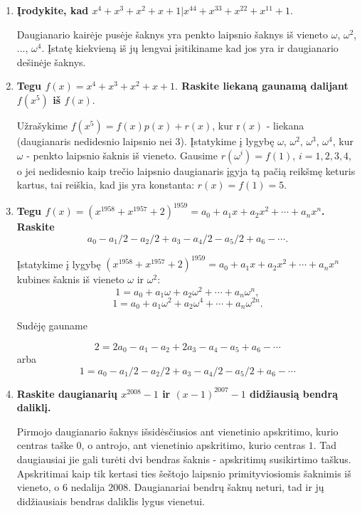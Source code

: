 \begin{enumerate}
\medskip 

\item {\bf Įrodykite, kad $x^4 + x^3 + x^2 + x + 1|x^{44} + x^{33} + x^{22} + x^{11} + 1.$}

\medskip

Daugianario kairėje pusėje šaknys yra penkto laipsnio šaknys iš vieneto $\omega$, $\omega^2$, $\dots$, $\omega^4$. Įstatę kiekvieną iš jų lengvai įsitikiname kad jos yra ir daugianario dešinėje šaknys.

\medskip

\item {\bf Tegu $f(x) = x^4 + x^3 + x^2 + x +1.$ Raskite liekaną gaunamą dalijant $f(x^5)$ iš $f(x).$}

\medskip

Užrašykime $f(x^5) = f(x)p(x) + r(x)$, kur r$(x)$ - liekana (daugianaris nedidesnio laipsnio nei $3$). Įstatykime į lygybę $\omega$, $\omega^2$, $\omega^3$, $\omega^4$, kur $\omega$ - penkto laipsnio šaknis iš vieneto. Gausime $r(\omega^i) = f(1)$, $i=1,2,3,4$, o jei nedidesnio kaip trečio laipsnio daugianaris įgyja tą pačią reikšmę keturis kartus, tai reiškia, kad jis yra konstanta: $r(x) = f(1) = 5$. 

\medskip

\item {\bf Tegu $f(x) = (x^{1958} + x^{1957} + 2)^{1959} = a_0 + a_1x + a_2x^2 + \cdots + a_nx^n$. Raskite
$$a_0 - a_1/2 -a_2/2 + a_3 -a_4/2 -a_5/2 + a_6 - \cdots.$$}

\medskip

Įstatykime į lygybę $(x^{1958} + x^{1957} + 2)^{1959} = a_0 + a_1x + a_2x^2 + \cdots + a_nx^n$ kubines šaknis iš vieneto $\omega$ ir $\omega^2$: 
$$1 = a_0 + a_1\omega + a_2\omega^2 + \cdots + a_n\omega^n,$$
$$1 = a_0 + a_1\omega^2 + a_2\omega^4 + \cdots + a_n\omega^{2n}.$$

Sudėję gauname

$$2 = 2a_0 - a_1 - a_2 + 2a_3 - a_4 - a_5 + a_6 - \cdots$$
arba
$$1 = a_0 - a_1/2 -a_2/2 + a_3 -a_4/2 -a_5/2 + a_6 - \cdots$$

\medskip

\item {\bf Raskite daugianarių $x^{2008} - 1$ ir $(x-1)^{2007} - 1$ didžiausią bendrą daliklį.}

\medskip

Pirmojo daugianario šaknys išsidėsčiusios ant vienetinio apskritimo, kurio centras taške $0$, o antrojo, ant vienetinio apskritimo, kurio centras $1$. Tad daugiausiai jie gali turėti dvi bendras šaknis - apskritimų susikirtimo taškus. Apskritimai kaip tik kertasi ties šeštojo laipsnio primityviosiomis šaknimis iš vieneto, o $6$ nedalija $2008$. Daugianariai bendrų šaknų neturi, tad ir jų didžiausiais bendras daliklis lygus vienetui.


\end{enumerate}
